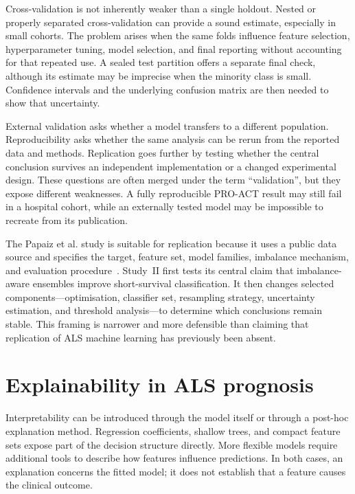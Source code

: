 Cross-validation is not inherently weaker than a single holdout. Nested or properly separated cross-validation can provide a sound estimate, especially in small cohorts. The problem arises when the same folds influence feature selection, hyperparameter tuning, model selection, and final reporting without accounting for that repeated use. A sealed test partition offers a separate final check, although its estimate may be imprecise when the minority class is small. Confidence intervals and the underlying confusion matrix are then needed to show that uncertainty.

External validation asks whether a model transfers to a different population. Reproducibility asks whether the same analysis can be rerun from the reported data and methods. Replication goes further by testing whether the central conclusion survives an independent implementation or a changed experimental design. These questions are often merged under the term ``validation'', but they expose different weaknesses. A fully reproducible \gls{PRO-ACT} result may still fail in a hospital cohort, while an externally tested model may be impossible to recreate from its publication.

The Papaiz et al. study is suitable for replication because it uses a public data source and specifies the target, feature set, model families, imbalance mechanism, and evaluation procedure~\cite{Papaiz2024}. Study~II first tests its central claim that imbalance-aware ensembles improve short-survival classification. It then changes selected components---optimisation, classifier set, resampling strategy, uncertainty estimation, and threshold analysis---to determine which conclusions remain stable. This framing is narrower and more defensible than claiming that replication of ALS machine learning has previously been absent.

\section{Explainability in ALS prognosis}

Interpretability can be introduced through the model itself or through a post-hoc explanation method. Regression coefficients, shallow trees, and compact feature sets expose part of the decision structure directly. More flexible models require additional tools to describe how features influence predictions. In both cases, an explanation concerns the fitted model; it does not establish that a feature causes the clinical outcome.

